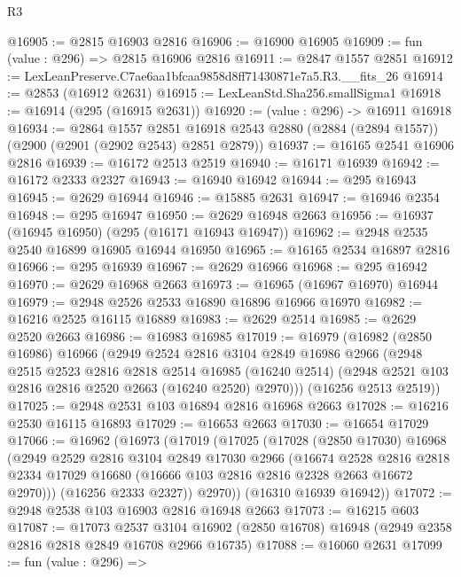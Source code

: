 \begin{lexlean}{R3}
\begin{coremodule}
@16905 := @2815 @16903 @2816
@16906 := @16900 @16905
@16909 := fun (value : @296) => @2815 @16906 @2816
@16911 := @2847 @1557 @2851
@16912 := LexLeanPreserve.C7ae6aa1bfcaa9858d8ff71430871e7a5.R3.__fits_26
@16914 := @2853 (@16912 @2631)
@16915 := LexLeanStd.Sha256.smallSigma1
@16918 := @16914 (@295 (@16915 @2631))
@16920 := (value : @296) -> @16911 @16918
@16934 := @2864
    @1557
    @2851
    @16918
    @2543
    @2880
    (@2884 (@2894 @1557))
    (@2900 (@2901 (@2902 @2543) @2851 @2879))
@16937 := @16165 @2541 @16906 @2816
@16939 := @16172 @2513 @2519
@16940 := @16171 @16939
@16942 := @16172 @2333 @2327
@16943 := @16940 @16942
@16944 := @295 @16943
@16945 := @2629 @16944
@16946 := @15885 @2631
@16947 := @16946 @2354
@16948 := @295 @16947
@16950 := @2629 @16948 @2663
@16956 := @16937 (@16945 @16950) (@295 (@16171 @16943 @16947))
@16962 := @2948 @2535 @2540 @16899 @16905 @16944 @16950
@16965 := @16165 @2534 @16897 @2816
@16966 := @295 @16939
@16967 := @2629 @16966
@16968 := @295 @16942
@16970 := @2629 @16968 @2663
@16973 := @16965 (@16967 @16970) @16944
@16979 := @2948 @2526 @2533 @16890 @16896 @16966 @16970
@16982 := @16216 @2525 @16115 @16889
@16983 := @2629 @2514
@16985 := @2629 @2520 @2663
@16986 := @16983 @16985
@17019 := @16979
    (@16982
      (@2850 @16986)
      @16966
      (@2949
        @2524
        @2816
        @3104
        @2849
        @16986
        @2966
        (@2948
          @2515
          @2523
          @2816
          @2818
          @2514
          @16985
          (@16240 @2514)
          (@2948 @2521 @103 @2816 @2816 @2520 @2663 (@16240 @2520) @2970)))
      (@16256 @2513 @2519))
@17025 := @2948 @2531 @103 @16894 @2816 @16968 @2663
@17028 := @16216 @2530 @16115 @16893
@17029 := @16653 @2663
@17030 := @16654 @17029
@17066 := @16962
    (@16973
      (@17019
        (@17025
          (@17028
            (@2850 @17030)
            @16968
            (@2949
              @2529
              @2816
              @3104
              @2849
              @17030
              @2966
              (@16674
                @2528
                @2816
                @2818
                @2334
                @17029
                @16680
                (@16666 @103 @2816 @2816 @2328 @2663 @16672 @2970)))
            (@16256 @2333 @2327))
          @2970))
      (@16310 @16939 @16942))
@17072 := @2948 @2538 @103 @16903 @2816 @16948 @2663
@17073 := @16215 @603
@17087 := @17073
    @2537
    @3104
    @16902
    (@2850 @16708)
    @16948
    (@2949 @2358 @2816 @2818 @2849 @16708 @2966 @16735)
@17088 := @16060 @2631
@17099 := fun (value : @296) =>

\end{coremodule}
\end{lexlean}
